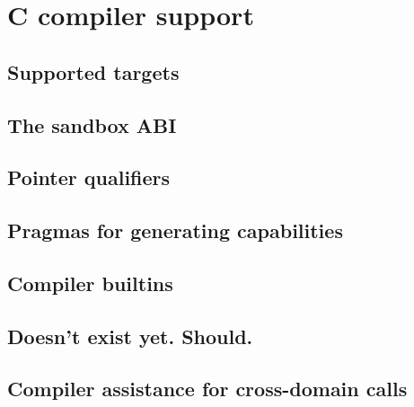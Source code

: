 \chapter{C compiler support}
\section{Supported targets}
\section{The sandbox ABI}
\section{Pointer qualifiers}
\section{Pragmas for generating capabilities}
\section{Compiler builtins}
\section{}
\section{}
\section{Doesn't exist yet.  Should.}
\section{Compiler assistance for cross-domain calls}

